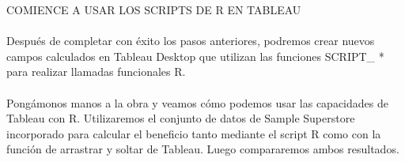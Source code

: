 \documentclass[12pt,letterpaper]{article}
\begin{document}
COMIENCE A USAR LOS SCRIPTS DE R EN TABLEAU
\\\\Después de completar con éxito los pasos anteriores, podremos crear nuevos campos calculados en
Tableau Desktop que utilizan las funciones SCRIPT\_ * para realizar llamadas funcionales R.
\\\\Pongámonos manos a la obra y veamos cómo podemos usar las capacidades de Tableau con R.
Utilizaremos el conjunto de datos de Sample Superstore incorporado para calcular el beneficio tanto
mediante el script R como con la función de arrastrar y soltar de Tableau. Luego compararemos ambos
resultados.
\end{document}
